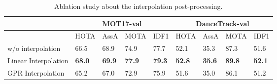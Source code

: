 \documentclass[10pt,twocolumn,letterpaper]{article}
\begin{document}
\begin{table*}[!htbp]
\centering
\caption{Ablation study about the interpolation post-processing.}
\setlength{\tabcolsep}{7pt}
\scriptsize
\begin{tabular}{ l | p{22px}p{22px}p{22px}p{22px}  | p{22px}p{22px}p{22px}p{22px}}

\toprule
& \multicolumn{4}{c|}{MOT17-val} & \multicolumn{4}{c}{DanceTrack-val}\\ 
\midrule
 & HOTA &  AssA & MOTA & IDF1 & HOTA &  AssA & MOTA & IDF1\\ 
\midrule
w/o interpolation & 66.5 & 68.9 & 74.9 & 77.7
& 52.1 & 35.3 & 87.3 & 51.6 \\
Linear Interpolation & \textbf{68.0}  &  \textbf{69.9} & \textbf{77.9} & \textbf{79.3} 
& \textbf{52.8} & \textbf{35.6} & \textbf{89.8} & \textbf{52.1} \\
GPR Interpolation & 65.2 & 67.0 & 72.9 & 75.9 
& 51.6 & 35.0 & 86.1 &  51.2\\
\bottomrule
\end{tabular}
\label{table:ablation_interpolation}
\end{table*}
\end{document}

